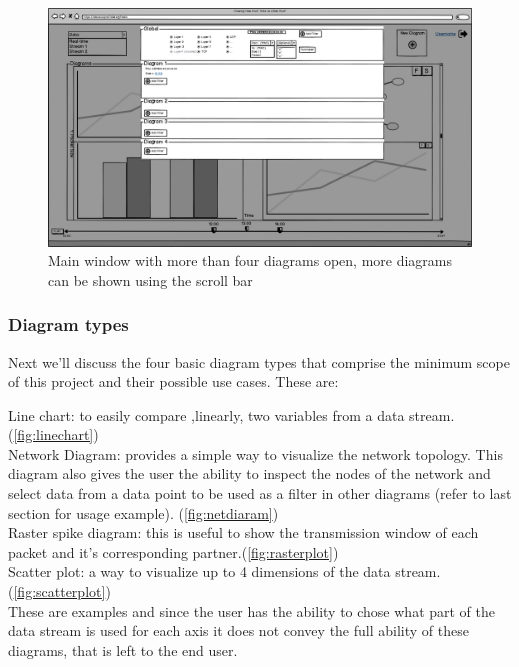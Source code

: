 \documentclass[twoside, english, draft]{Pflichtenheft}
\begin{document}
\begin{figure}[h]
	\centering
	\includegraphics[width=\textwidth]{Images/09MW.png}
	\caption{Main window with more than four diagrams open, more diagrams can be shown using the scroll bar}
	\label{fig:mainWindow6}
\end{figure}

\clearpage

\subsubsection{Diagram types}

Next we'll discuss the four basic diagram types that comprise the minimum scope of this project and their possible use cases.
These are:

Line chart: to easily compare ,linearly, two variables from a data stream.(\autoref{fig:linechart})
\\
Network Diagram: provides a simple way to visualize the network topology. This diagram also gives the user the ability to inspect the nodes of the network and select data from a data point to be used as a filter in other diagrams (refer to last section for usage example).
(\autoref{fig:netdiaram})
\\
Raster spike diagram: this is useful to show the transmission window of each packet and it's corresponding partner.(\autoref{fig:rasterplot})
\\
Scatter plot: a way to visualize up to 4 dimensions of the data stream.(\autoref{fig:scatterplot})
\\
These are examples and since the user has the ability to chose what part of the data stream is used for each axis it does not convey the full ability of these diagrams, that is left to the end user.
\end{document}
